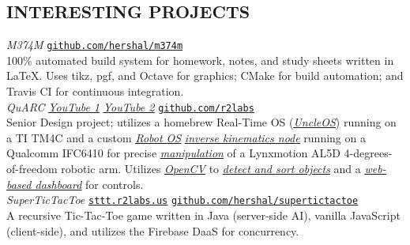 \documentclass[margin]{res}
\begin{document}
\begin{resume}
  \section{INTERESTING PROJECTS}
  {\sl M374M} \hfill \href{https://github.com/hershal/m374m}
  {\ul{\texttt{github.com/hershal/m374m}}} \\
  100\% automated build system for homework, notes, and study sheets written in
  \LaTeX{}. Uses tikz, pgf, and Octave for graphics; CMake for build automation;
  and Travis CI for continuous integration.
  \vspace{0.5em} \\
  {\sl QuARC} \hfill
  \href{https://www.youtube.com/watch?v=MEig9XBwUmU}{\sl \ul{YouTube 1}}\quad
  \href{https://www.youtube.com/watch?v=ggipd0oqxwY}{\sl \ul{YouTube 2}}\quad
  \href{https://github.com/r2labs}{\ul{\texttt{github.com/r2labs}}} \\
  Senior Design project; utilizes a homebrew Real-Time OS
  (\href{https://github.com/r2labs/uncleos}{\sl \ul{UncleOS}}) running on a TI
  TM4C and a custom \href{http://www.ros.org}{\sl \ul{Robot OS}}
  \href{https://github.com/r2labs/quarc-inverse-kinematics}{\sl \ul{inverse
      kinematics node}} running on a Qualcomm IFC6410 for precise
  \href{https://github.com/r2labs/quarc-user-interface}{\sl \ul{manipulation}}
  of a Lynxmotion AL5D 4-degrees-of-freedom robotic arm. Utilizes
  \href{http://opencv.org}{\sl\ul{OpenCV}} to
  \href{https://github.com/r2labs/quarc-vision}{\sl \ul{detect and sort
      objects}} and a \href{https://github.com/r2labs/quarc-web-interface}{\sl
    \ul{web-based dashboard}} for controls.
  \vspace{0.5em}\\
  {\sl SuperTicTacToe} \hfill
  \href{http://sttt.r2labs.us}{\ul{\texttt{sttt.r2labs.us}}}\quad
  \href{https://github.com/hershal/supertictactoe}{\ul{\texttt{github.com/hershal/supertictactoe}}} \\
  A recursive Tic-Tac-Toe game written in Java (server-side AI), vanilla
  JavaScript (client-side), and utilizes the Firebase DaaS for concurrency.


\end{resume}
\end{document}

